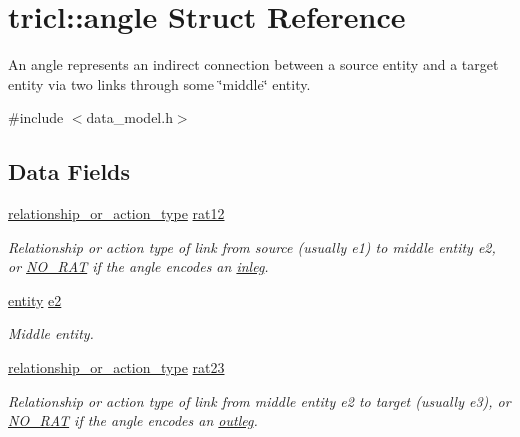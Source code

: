 \hypertarget{structtricl_1_1angle}{}\section{tricl\+:\+:angle Struct Reference}
\label{structtricl_1_1angle}


An angle represents an indirect connection between a source entity and a target entity via two links through some \char`\"{}middle\char`\"{} entity.  




{\ttfamily \#include $<$data\+\_\+model.\+h$>$}

\subsection*{Data Fields}
\begin{DoxyCompactItemize}
\item 
\mbox{\label{structtricl_1_1angle_af850c72e4b4b69131e171984213e306d}} 
\hyperlink{namespacetricl_a2d01894944fb58a8fedc0912a48d13f8}{relationship\+\_\+or\+\_\+action\+\_\+type} \hyperlink{structtricl_1_1angle_af850c72e4b4b69131e171984213e306d}{rat12}
\begin{DoxyCompactList}\small\item\em Relationship or action type of link from source (usually {\ttfamily e1}) to middle entity {\ttfamily e2}, or \hyperlink{data__model_8h_ae71ff63a5bdb6bfc09a18840c8df4e54}{N\+O\+\_\+\+R\+AT} if the angle encodes an \hyperlink{structtricl_1_1inleg}{inleg}. \end{DoxyCompactList}\item 
\mbox{\label{structtricl_1_1angle_ac03e3d590e5228ebf4a5137ec72a7219}} 
\hyperlink{namespacetricl_a57273122278e8b301844e2a2e1f0742f}{entity} \hyperlink{structtricl_1_1angle_ac03e3d590e5228ebf4a5137ec72a7219}{e2}
\begin{DoxyCompactList}\small\item\em Middle entity. \end{DoxyCompactList}\item 
\mbox{\label{structtricl_1_1angle_af0ec7d54e4d93cbf5df891dcc8397453}} 
\hyperlink{namespacetricl_a2d01894944fb58a8fedc0912a48d13f8}{relationship\+\_\+or\+\_\+action\+\_\+type} \hyperlink{structtricl_1_1angle_af0ec7d54e4d93cbf5df891dcc8397453}{rat23}
\begin{DoxyCompactList}\small\item\em Relationship or action type of link from middle entity {\ttfamily e2} to target (usually {\ttfamily e3}), or \hyperlink{data__model_8h_ae71ff63a5bdb6bfc09a18840c8df4e54}{N\+O\+\_\+\+R\+AT} if the angle encodes an \hyperlink{structtricl_1_1outleg}{outleg}. \end{DoxyCompactList}\end{DoxyCompactItemize}
